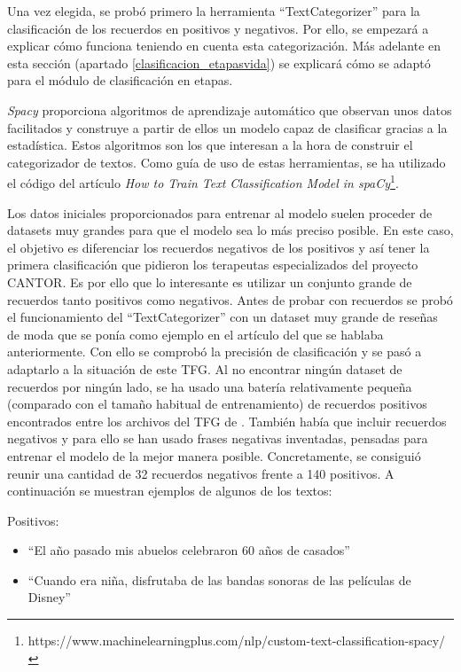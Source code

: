 Una vez elegida, se probó primero la herramienta ``TextCategorizer'' para la clasificación de los recuerdos en positivos y negativos. Por ello, se empezará a explicar cómo funciona teniendo en cuenta esta categorización. Más adelante en esta sección (apartado \ref{clasificacion_etapasvida}) se explicará cómo se adaptó para el módulo de clasificación en etapas. 

\textit{Spacy} proporciona algoritmos de aprendizaje automático que observan unos datos facilitados y construye a partir de ellos un modelo capaz de clasificar gracias a la estadística. Estos algoritmos son los que interesan a la hora de construir el categorizador de textos. Como guía de uso de estas herramientas, se ha utilizado el código del artículo \textit{How to Train Text Classification Model in spaCy}\footnote{https://www.machinelearningplus.com/nlp/custom-text-classification-spacy/}.

Los datos iniciales proporcionados para entrenar al modelo suelen proceder de datasets muy grandes para que el modelo sea lo más preciso posible. En este caso, el objetivo es diferenciar los recuerdos negativos de los positivos y así tener la primera clasificación que pidieron los terapeutas especializados del proyecto CANTOR. Es por ello que lo interesante es utilizar un conjunto grande de recuerdos tanto positivos como negativos. Antes de probar con recuerdos se probó el funcionamiento del  ``TextCategorizer'' con un dataset muy grande de reseñas de moda que se ponía como ejemplo en el artículo del que se hablaba anteriormente. Con ello se comprobó la precisión de clasificación y se pasó a adaptarlo a la situación de este TFG. Al no encontrar ningún dataset de recuerdos por ningún lado, se ha usado una batería relativamente pequeña (comparado con el tamaño habitual de entrenamiento) de recuerdos positivos encontrados entre los archivos del TFG de \cite{lcastilla}. También había que incluir recuerdos negativos y para ello se han usado frases negativas inventadas, pensadas para entrenar el modelo de la mejor manera posible. Concretamente, se consiguió reunir una cantidad de 32 recuerdos negativos frente a 140 positivos. A continuación se muestran ejemplos de algunos de los textos:

Positivos:
\begin{itemize}
	\item ``El año pasado mis abuelos celebraron 60 años de casados''
	\item ``Cuando era niña, disfrutaba de las bandas sonoras de las películas de Disney''
\end{itemize}

